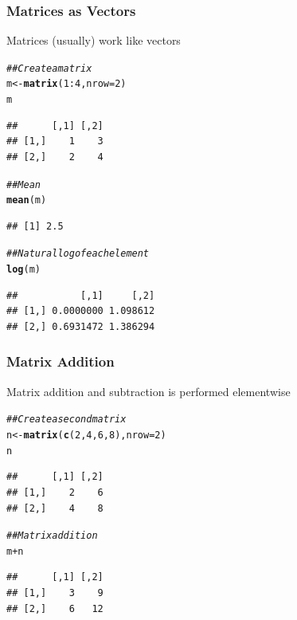 \documentclass{beamer}\usepackage[]{graphicx}\usepackage[]{xcolor}
\makeatletter
\newcommand{\hlnum}[1]{\textcolor[rgb]{0.686,0.059,0.569}{#1}}%
\newcommand{\hlcom}[1]{\textcolor[rgb]{0.678,0.584,0.686}{\textit{#1}}}%
\newcommand{\hlopt}[1]{\textcolor[rgb]{0,0,0}{#1}}%
\newcommand{\hlstd}[1]{\textcolor[rgb]{0.345,0.345,0.345}{#1}}%
\newcommand{\hlkwb}[1]{\textcolor[rgb]{0.69,0.353,0.396}{#1}}%
\newcommand{\hlkwc}[1]{\textcolor[rgb]{0.333,0.667,0.333}{#1}}%
\newcommand{\hlkwd}[1]{\textcolor[rgb]{0.737,0.353,0.396}{\textbf{#1}}}%
\newenvironment{kframe}{%
 \def\at@end@of@kframe{}%
 \ifinner\ifhmode%
  \def\at@end@of@kframe{\end{minipage}}%
  \begin{minipage}{\columnwidth}%
 \fi\fi%
 \def\FrameCommand##1{\hskip\@totalleftmargin \hskip-\fboxsep
 \colorbox{shadecolor}{##1}\hskip-\fboxsep
     \hskip-\linewidth \hskip-\@totalleftmargin \hskip\columnwidth}%
 \MakeFramed {\advance\hsize-\width
   \@totalleftmargin\z@ \linewidth\hsize
   \@setminipage}}%
 {\par\unskip\endMakeFramed%
 \at@end@of@kframe}
\newenvironment{knitrout}{}{} %
\makeatother
\begin{document}
\begin{frame}[fragile]\frametitle{Matrices as Vectors}
    Matrices (usually) work like vectors
\begin{knitrout}\footnotesize
{}\color{fgcolor}\begin{kframe}
\begin{alltt}
\hlcom{## Create a matrix}
\hlstd{m} \hlkwb{<-} \hlkwd{matrix}\hlstd{(}\hlnum{1}\hlopt{:}\hlnum{4}\hlstd{,} \hlkwc{nrow} \hlstd{=} \hlnum{2}\hlstd{)}
\hlstd{m}
\end{alltt}
\begin{verbatim}
##      [,1] [,2]
## [1,]    1    3
## [2,]    2    4
\end{verbatim}
\begin{alltt}
\hlcom{## Mean}
\hlkwd{mean}\hlstd{(m)}
\end{alltt}
\begin{verbatim}
## [1] 2.5
\end{verbatim}
\begin{alltt}
\hlcom{## Natural log of each element}
\hlkwd{log}\hlstd{(m)}
\end{alltt}
\begin{verbatim}
##           [,1]     [,2]
## [1,] 0.0000000 1.098612
## [2,] 0.6931472 1.386294
\end{verbatim}
\end{kframe}
\end{knitrout}
\end{frame}

\begin{frame}[fragile]\frametitle{Matrix Addition}
    Matrix addition and subtraction is performed elementwise
\begin{knitrout}\footnotesize
{}\color{fgcolor}\begin{kframe}
\begin{alltt}
\hlcom{## Create a second matrix}
\hlstd{n} \hlkwb{<-} \hlkwd{matrix}\hlstd{(}\hlkwd{c}\hlstd{(}\hlnum{2}\hlstd{,} \hlnum{4}\hlstd{,} \hlnum{6}\hlstd{,} \hlnum{8}\hlstd{),} \hlkwc{nrow} \hlstd{=} \hlnum{2}\hlstd{)}
\hlstd{n}
\end{alltt}
\begin{verbatim}
##      [,1] [,2]
## [1,]    2    6
## [2,]    4    8
\end{verbatim}
\begin{alltt}
\hlcom{## Matrix addition}
\hlstd{m} \hlopt{+} \hlstd{n}
\end{alltt}
\begin{verbatim}
##      [,1] [,2]
## [1,]    3    9
## [2,]    6   12
\end{verbatim}
\end{kframe}
\end{knitrout}
\end{frame}
\end{document}
